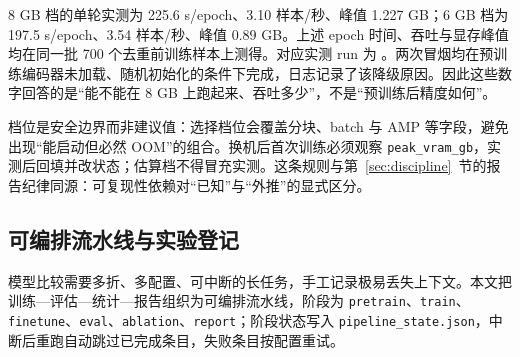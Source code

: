 \begin{table}[t]
\centering
\caption{显存档位配方。6 GB 与 8 GB 为实测，实测条件为去重前 700 训练样本；12 GB 及以上为外推估算，不得当作实测值引用。}
\label{tab:vram}
\small
{}
\end{table}

8 GB 档的单轮实测为 225.6 s/epoch、3.10 样本/秒、峰值 1.227 GB；6 GB 档为 197.5 s/epoch、3.54 样本/秒、峰值 0.89 GB。上述 epoch 时间、吞吐与显存峰值均在同一批 700 个去重前训练样本上测得。对应实测 run 为 。两次冒烟均在预训练编码器未加载、随机初始化的条件下完成，日志记录了该降级原因。因此这些数字回答的是“能不能在 8 GB 上跑起来、吞吐多少”，不是“预训练后精度如何”。



档位是安全边界而非建议值：选择档位会覆盖分块、batch 与 AMP 等字段，避免出现“能启动但必然 OOM”的组合。换机后首次训练必须观察 \texttt{peak\_vram\_gb}，实测后回填并改状态；估算档不得冒充实测。这条规则与第~\ref{sec:discipline}~节的报告纪律同源：可复现性依赖对“已知”与“外推”的显式区分。

\subsection{可编排流水线与实验登记}\label{sec:pipeline}

模型比较需要多折、多配置、可中断的长任务，手工记录极易丢失上下文。本文把训练—评估—统计—报告组织为可编排流水线，阶段为 \texttt{pretrain}、\texttt{train}、\texttt{finetune}、\texttt{eval}、\texttt{ablation}、\texttt{report}；阶段状态写入 \texttt{pipeline\_state.json}，中断后重跑自动跳过已完成条目，失败条目按配置重试。

